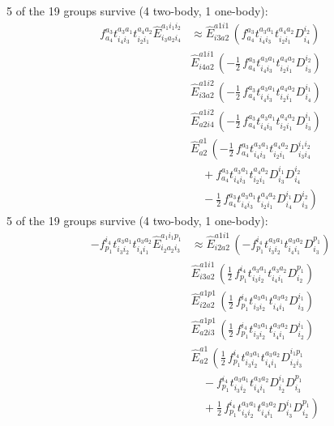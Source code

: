 \documentclass[11pt]{article}
\begin{document}
5 of the 19 groups survive (4 two-body, 1 one-body):
\begin{align}
f^{a_{3}}_{a_{4}} t^{a_{3}a_{1}}_{i_{4}i_{3}} t^{a_{4}a_{2}}_{i_{2}i_{1}} \hat{E}^{a_{1}i_{1}i_{2}}_{i_{3}a_{2}i_{4}} &\approx \hat{E}^{a1i1}_{i3a2}\,\left(f^{a_{3}}_{a_{4}} t^{a_{3}a_{1}}_{i_{4}i_{3}} t^{a_{4}a_{2}}_{i_{2}i_{1}} D^{i_{2}}_{i_{4}} \right) \\
&\hat{E}^{a1i1}_{i4a2}\,\left(- \tfrac{1}{2}\, f^{a_{3}}_{a_{4}} t^{a_{3}a_{1}}_{i_{4}i_{3}} t^{a_{4}a_{2}}_{i_{2}i_{1}} D^{i_{2}}_{i_{3}} \right) \\
&\hat{E}^{a1i2}_{i3a2}\,\left(- \tfrac{1}{2}\, f^{a_{3}}_{a_{4}} t^{a_{3}a_{1}}_{i_{4}i_{3}} t^{a_{4}a_{2}}_{i_{2}i_{1}} D^{i_{1}}_{i_{4}} \right) \\
&\hat{E}^{a1i2}_{a2i4}\,\left(- \tfrac{1}{2}\, f^{a_{3}}_{a_{4}} t^{a_{3}a_{1}}_{i_{4}i_{3}} t^{a_{4}a_{2}}_{i_{2}i_{1}} D^{i_{1}}_{i_{3}} \right) \\
&\hat{E}^{a1}_{a2}\,\left(- \tfrac{1}{2}\, f^{a_{3}}_{a_{4}} t^{a_{3}a_{1}}_{i_{4}i_{3}} t^{a_{4}a_{2}}_{i_{2}i_{1}} D^{i_{1}i_{2}}_{i_{3}i_{4}} \right. \\
&\left.\quad + f^{a_{3}}_{a_{4}} t^{a_{3}a_{1}}_{i_{4}i_{3}} t^{a_{4}a_{2}}_{i_{2}i_{1}} D^{i_{1}}_{i_{3}} D^{i_{2}}_{i_{4}} \right. \\
&\left.\quad - \tfrac{1}{2}\, f^{a_{3}}_{a_{4}} t^{a_{3}a_{1}}_{i_{4}i_{3}} t^{a_{4}a_{2}}_{i_{2}i_{1}} D^{i_{1}}_{i_{4}} D^{i_{2}}_{i_{3}} \right)
\end{align}
5 of the 19 groups survive (4 two-body, 1 one-body):
\begin{align}
- f^{i_{4}}_{p_{1}} t^{a_{3}a_{1}}_{i_{3}i_{2}} t^{a_{3}a_{2}}_{i_{4}i_{1}} \hat{E}^{a_{1}i_{1}p_{1}}_{i_{2}a_{2}i_{3}} &\approx \hat{E}^{a1i1}_{i2a2}\,\left(- f^{i_{4}}_{p_{1}} t^{a_{3}a_{1}}_{i_{3}i_{2}} t^{a_{3}a_{2}}_{i_{4}i_{1}} D^{p_{1}}_{i_{3}} \right) \\
&\hat{E}^{a1i1}_{i3a2}\,\left(\tfrac{1}{2}\, f^{i_{4}}_{p_{1}} t^{a_{3}a_{1}}_{i_{3}i_{2}} t^{a_{3}a_{2}}_{i_{4}i_{1}} D^{p_{1}}_{i_{2}} \right) \\
&\hat{E}^{a1p1}_{i2a2}\,\left(\tfrac{1}{2}\, f^{i_{4}}_{p_{1}} t^{a_{3}a_{1}}_{i_{3}i_{2}} t^{a_{3}a_{2}}_{i_{4}i_{1}} D^{i_{1}}_{i_{3}} \right) \\
&\hat{E}^{a1p1}_{a2i3}\,\left(\tfrac{1}{2}\, f^{i_{4}}_{p_{1}} t^{a_{3}a_{1}}_{i_{3}i_{2}} t^{a_{3}a_{2}}_{i_{4}i_{1}} D^{i_{1}}_{i_{2}} \right) \\
&\hat{E}^{a1}_{a2}\,\left(\tfrac{1}{2}\, f^{i_{4}}_{p_{1}} t^{a_{3}a_{1}}_{i_{3}i_{2}} t^{a_{3}a_{2}}_{i_{4}i_{1}} D^{i_{1}p_{1}}_{i_{2}i_{3}} \right. \\
&\left.\quad - f^{i_{4}}_{p_{1}} t^{a_{3}a_{1}}_{i_{3}i_{2}} t^{a_{3}a_{2}}_{i_{4}i_{1}} D^{i_{1}}_{i_{2}} D^{p_{1}}_{i_{3}} \right. \\
&\left.\quad + \tfrac{1}{2}\, f^{i_{4}}_{p_{1}} t^{a_{3}a_{1}}_{i_{3}i_{2}} t^{a_{3}a_{2}}_{i_{4}i_{1}} D^{i_{1}}_{i_{3}} D^{p_{1}}_{i_{2}} \right)
\end{align}
\end{document}
